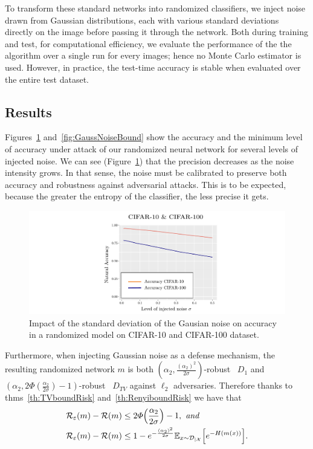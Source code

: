 To transform these standard networks into randomized classifiers, we inject noise drawn from Gaussian distributions, each with various standard deviations directly on the image before passing it through the network. Both during training and test, for computational efficiency, we evaluate the performance of the the algorithm over a single run for every images; hence no Monte Carlo estimator is used. However, in practice, the test-time accuracy is stable when evaluated over the entire test dataset.

\subsection{Results}
 
Figures~\ref{fig:GaussNoiseaccuracy} and~\ref{fig:GaussNoiseBound} show the accuracy and the minimum level of accuracy under attack of our randomized neural network for several levels of injected noise. We can see (Figure~\ref{fig:GaussNoiseaccuracy}) that the precision decreases as the noise intensity grows. In that sense, the noise must be calibrated to preserve both accuracy and robustness against adversarial attacks. This is to be expected, because the greater the entropy of the classifier, the less precise it gets.

 \begin{figure}[!ht]
\centering
    \includegraphics[width=\textwidth]{sections/appendix/mlj_rando/images/AccuracyCIFAR10andCIFAR100Gauss.pdf}
\caption{Impact of the standard deviation of the Gausian noise on accuracy in a randomized model on CIFAR-10 and CIFAR-100 dataset.}
\label{fig:GaussNoiseaccuracy}
\end{figure}


Furthermore, when injecting Gaussian noise as a defense mechanism, the resulting randomized network $m $ is both $(\alpha_2, \frac{(\alpha_2)^2}{2 \sigma})$-robust \wrt~$D_1$ and $(\alpha_2,2 \Phi\left( \frac{\alpha_2}{2 \sigma} \right) - 1)$-robust \wrt~$D_{TV}$ against $\ell_2$ adversaries. Therefore thanks to thms~\ref{th:TVboundRisk} and~\ref{th:RenyiboundRisk} we have that
\begin{align}
    \risk_\varepsilon(m ) - \risk(m ) &\leq 2 \Phi\left( \frac{\alpha_2}{2 \sigma} \right) - 1, \text{\emph{ and}} \label{eq:boundTVriskgap}\\
    \risk_\varepsilon(m ) - \risk(m ) &\leq 1-e^{-\frac{(\alpha_2)^2}{2 \sigma}} \mathbb{E}_{x  \sim \mathcal{D}_{\mid \XX}}\left[e^{-H(m (x ))}\right].\label{eq:boundRenyiriskgap}
\end{align}

